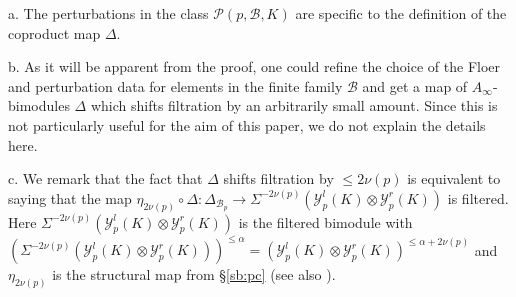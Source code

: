 	\begin{rem} a. The perturbations in the class $\mathcal{P}(p,\mathcal{B},K)$ are specific to the definition of
	the coproduct map $\Delta$.%

b. As it will be apparent from the proof, one could refine the choice of the Floer and perturbation data for elements in the finite family $\mathcal{B}$ and get a map of $A_\infty$-bimodules $\Delta$ which shifts filtration by an arbitrarily small amount. Since this is not particularly useful for the aim of this paper, we do not explain the details here.

c. We remark that the fact that $\Delta$ shifts filtration by $\leq 2\nu(p)$ is equivalent to saying that the map $\eta_{2\nu(p)}\circ \Delta\colon \Delta_{\mathcal{B}_p}\to \Sigma^{-2\nu(p)}(\mathcal{Y}_{p}^l(K)\otimes \mathcal{Y}_{p}^r(K))$ is filtered. Here $\Sigma^{-2\nu(p)}(\mathcal{Y}_{p}^l(K)\otimes \mathcal{Y}_{p}^r(K))$ is the filtered bimodule with $(\Sigma^{-2\nu(p)}(\mathcal{Y}_{p}^l(K)\otimes \mathcal{Y}_{p}^r(K)))^{\leq \alpha} = (\mathcal{Y}_{p}^l(K)\otimes \mathcal{Y}_{p}^r(K))^{\leq \alpha + 2\nu(p)}$ and $\eta_{2\nu(p)}$ is the structural map from \S\ref{sb:pc} (see also \cite[Section 2.2.3]{BCZ:tpc}).

\end{rem}

